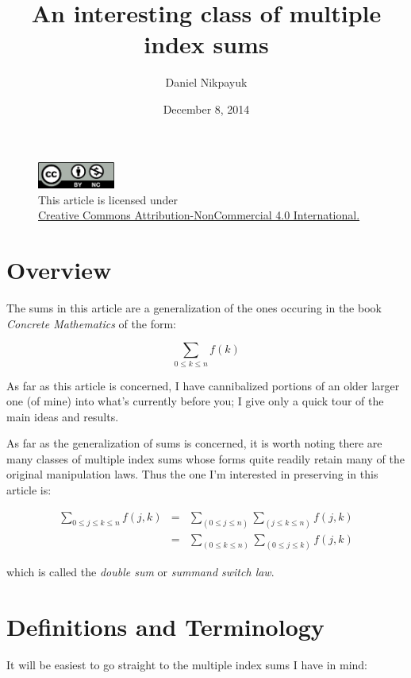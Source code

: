 \documentclass[twoside]{amsart}
\title{An interesting class of multiple index sums}
\author{Daniel Nikpayuk}
\date{December 8, 2014}
\begin{document}
\maketitle

\begin{figure}[h]
\centering
\includegraphics[width=1in]{../../../cc-by-nc.png}\\[0.1in]
\tiny This article is licensed under \\
\href{http://creativecommons.org/licenses/by-nc/4.0/}
{Creative Commons Attribution-NonCommercial 4.0 International.}\\[0.3in]
\end{figure}

\section{Overview}

The sums in this article are a generalization of the ones occuring
in the book \emph{Concrete Mathematics} \cite{gkp} of the form:

$$ \sum_{0\le k\le n}f(k) $$

As far as this article is concerned, I have cannibalized portions of an older larger one (of mine)
into what's currently before you; I give only a quick tour of the main ideas and results.

As far as the generalization of sums is concerned, it is worth noting there are many
classes of multiple index sums whose forms quite readily retain many of the original
manipulation laws.  Thus the one I'm interested in preserving in this article is:

\begin{eqnarray*}
\sum_{0\le j\le k\le n}f(j,k)
 & = & \sum_{(0\le j\le n)}\sum_{(j\le k\le n)}f(j,k) \\  
 & = & \sum_{(0\le k\le n)}\sum_{(0\le j\le k)}f(j,k)       
\end{eqnarray*}

which is called the \emph{double sum} or \emph{summand switch law}.

\section{Definitions and Terminology}

It will be easiest to go straight to the multiple index sums I have in mind:
\end{document}
